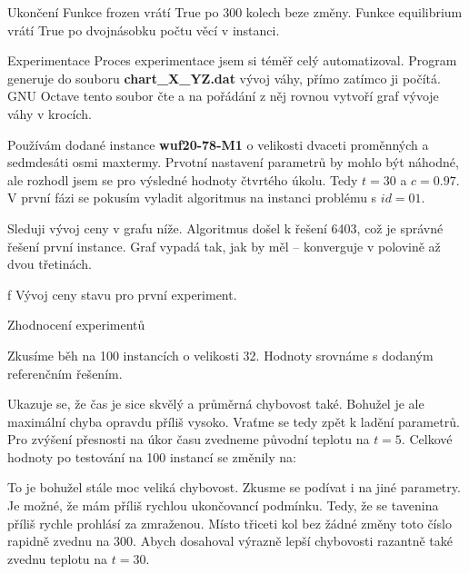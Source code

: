 \secc Ukončení
Funkce frozen vrátí True po 300 kolech beze změny. Funkce equilibrium vrátí True po dvojnásobku počtu věcí v instanci.


\vfill\break
\sec Experimentace
Proces experimentace jsem si téměř celý automatizoval. Program generuje do souboru {\bf chart\_X\_YZ.dat} vývoj váhy, přímo zatímco ji počítá. GNU Octave tento soubor čte a na pořádání z něj rovnou vytvoří graf vývoje váhy v krocích.

Používám dodané instance {\bf wuf20-78-M1} o velikosti dvaceti proměnných a sedmdesáti osmi maxtermy. Prvotní nastavení parametrů by mohlo být náhodné, ale rozhodl jsem se pro výsledné hodnoty čtvrtého úkolu. Tedy  $t = 30$ a $c = 0.97$. V první fázi se pokusím vyladit algoritmus na instanci problému s $id=01$.

Sleduji vývoj ceny v grafu níže. Algoritmus došel k řešení 6403, což je správné řešení první instance. Graf vypadá tak, jak by měl -- konverguje v polovině až dvou třetinách.



\centerline{ \picwidth=17cm  }
\caption/f Vývoj ceny stavu pro první experiment.
\bigskip


















\vfill\break
\sec Zhodnocení experimentů


Zkusíme běh na 100 instancích o velikosti 32. Hodnoty srovnáme s dodaným referenčním řešením.

\bigskip
\centerline{}\bigskip


Ukazuje se, že čas je sice skvělý a průměrná chybovost také. Bohužel je ale maximální chyba opravdu příliš vysoko. Vraťme se tedy zpět k ladění parametrů. Pro zvýšení přesnosti na úkor času zvedneme původní teplotu na $t=5$. Celkové hodnoty po testování na 100 instancí se změnily na:

\bigskip
\centerline{}\bigskip

To je bohužel stále moc veliká chybovost. Zkusme se podívat i na jiné parametry. Je možné, že mám příliš rychlou ukončovancí podmínku. Tedy, že se tavenina příliš rychle prohlásí za zmraženou. Místo třiceti kol bez žádné změny toto číslo rapidně zvednu na 300. Abych dosahoval výrazně lepší chybovosti razantně také zvednu teplotu na $t=30$.

